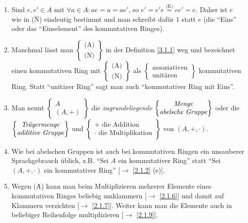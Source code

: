 \documentclass[../../main.tex]{subfiles}
\begin{document}
\begin{bem}\label{3.1.2}
\begin{enumerate}[\normalfont(a)]
\item Sind $e,e'\in A$ mit $\forall a\in A: ae =a = ae'$, so $e'=e'e\overset{\text{(\. K)}}=ee' = e$. Daher ist $e$ wie in (\. N) eindeutig bestimmt und man schreibt dafür $1$ statt $e$ (die "`Eins"' oder das "`Einselement"' des kommutativen Ringes).
\item Manchmal lässt man $\begin{Bmatrix}\text{(\. A)}\\\text{(\. N)}\end{Bmatrix}$ in der Definition \ref{3.1.1} weg und bezeichnet einen kommutativen Ring mit $\begin{Bmatrix}\text{(\. A)}\\\text{(\. N)}\end{Bmatrix}$ als $\begin{Bmatrix}\text{assoziativen}\\\text{unitären}\end{Bmatrix}$ kommutativen Ring. Statt "`unitärer Ring"' sagt man auch "`kommutativer Ring mit Eins"'.
\item Man nennt $\begin{Bmatrix}A\\(A,+)\end{Bmatrix}$ die \emph{zugrundeliegende}
$\begin{Bmatrix}\text{\emph{Menge}}\\\text{\emph{abelsche Gruppe}}\end{Bmatrix}$ oder die
$\begin{Bmatrix}\text{\emph{Trägermenge}}\index{kommutativer Ring@{\bf kommutativer Ring}!Trägermenge}\\\text{\emph{additive Gruppe}}\index{kommutativer Ring@{\bf kommutativer Ring}!additive Gruppe}\end{Bmatrix}$ und
$\begin{Bmatrix}+\text{ die Addition}\\\cdot\text{ die Multiplikation}\end{Bmatrix}$ von $(A,+,\cdot)$.
\item Wie bei abelschen Gruppen ist auch bei kommutativen Ringen ein unsauberer Sprachgebrauch üblich, z.B. "`Sei $A$ ein kommutativer Ring"' statt "`Sei $(A,+,\cdot)$ ein kommutativer Ring"' [$\to$ \ref{2.1.2} (e)].
\item Wegen (\. A) kann man beim Multiplizieren mehrerer Elemente eines kommutativen Ringes beliebig umklammern [$\to$ \ref{2.1.6}] und damit auf Klammern verzichten [$\to$ \ref{2.1.7}]. Weiter kann man die Elemente auch in beliebiger Reihenfolge multiplizieren [$\to$ \ref{2.1.9}].

\end{enumerate}
\end{bem}
\end{document}
